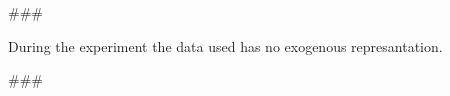 
\usepackage{comment}


###

During the experiment the data used has no exogenous represantation.

###



\begin{comment}
Author = DIEGO MICCOLI
Alias = Kozen88
Organization = SWAP Research Group UniBa
Date = 27-12-2023

This mini template is not working by itself because there are latex command missing needed
to compile the file and give as output a pdf file, in addition it has been added jinja
statement in order to control the rendering of the latex file with the jinja library, for these
reasons it needs to be used with the other mini chunks in conjunction.
\end{comment}